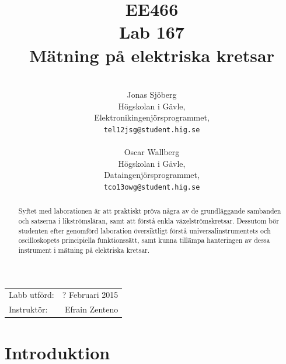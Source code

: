 \documentclass[11pt,a4paper]{article}
\title{EE466 \\ Lab 167 \\ Mätning på elektriska kretsar}
\author{\\
  Jonas Sjöberg\\
  Högskolan i Gävle,\\
  Elektronikingenjörsprogrammet,\\
  \texttt{tel12jsg@student.hig.se}\\
  \\
  Oscar Wallberg\\
  Högskolan i Gävle,\\
  Dataingenjörsprogrammet,\\
  \texttt{tco13owg@student.hig.se}\\}
\date{}
\begin{document}
\maketitle

\begin{center}
    \begin{tabular}{l r}
        Labb utförd: & ? Februari 2015 \\
        Instruktör: & Efrain Zenteno
    \end{tabular}
\end{center}

\begin{abstract}
    Syftet med laborationen är att praktiskt pröva några av de grundläggande
    sambanden och satserna i likströmsläran, samt att förstå enkla
    växelströmskretsar. Dessutom bör studenten efter genomförd laboration
    översiktligt förstå universalinstrumentets och oscilloskopets principiella
    funktionssätt, samt kunna tillämpa hanteringen av dessa instrument i
    mätning på elektriska kretsar.
\end{abstract}

\newpage

{
    \setcounter{tocdepth}{3}
    \tableofcontents
}

\newpage

\section{Introduktion}\label{setup}


\end{document}
